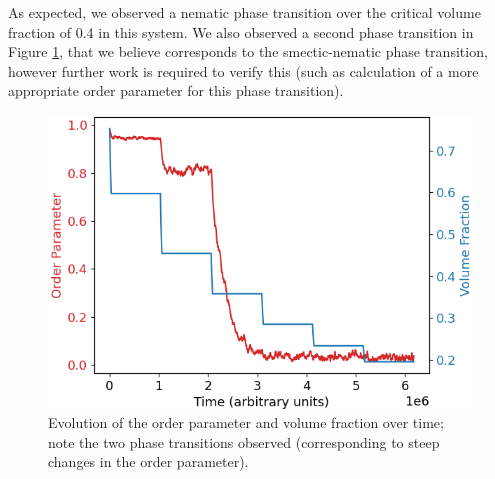 \documentclass[11pt, a4paper]{article} %
\begin{document}
As expected, we observed a nematic phase transition over the critical volume fraction of 0.4 in this system. We also observed a second phase transition in Figure \ref{fig:crystalline_order}, that we believe corresponds to the smectic-nematic phase transition, however further work is required to verify this (such as calculation of a more appropriate order parameter for this phase transition). 

\begin{figure}[ht]
	\centering
	\includegraphics[width=0.7\linewidth]{Figures/order_and_volfrac_crystal}
	\caption{Evolution of the order parameter and volume fraction over time; note the two phase transitions observed (corresponding to steep changes in the order parameter).}
	\label{fig:crystalline_order}
\end{figure}

\printbibliography
\end{document}
